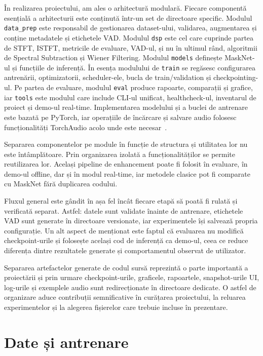 \documentclass[12pt,a4paper]{report}
\begin{document}
În realizarea proiectului, am ales o arhitectură modulară. Fiecare 
componentă esențială a arhitecturii este conținută într-un set de 
directoare specific. Modulul \texttt{data\_prep} este responsabil de 
gestionarea dataset-ului, validarea, augmentarea și conține metadatele
și etichetele VAD. Modulul \texttt{dsp} este cel care cuprinde partea de STFT,
ISTFT, metricile de evaluare, VAD-ul, și nu în ultimul rând, 
algoritmii de Spectral Subtraction și Wiener Filtering. Modulul 
\texttt{models} definește MaskNet-ul și funcțiile de inferență. În esența 
modulului de \texttt{train} se regăsesc configurarea antrenării, optimizatorii, 
scheduler-ele, bucla de train/validation și checkpointing-ul. Pe 
partea de evaluare, modulul \texttt{eval} produce rapoarte, comparații și 
grafice, iar \texttt{tools} este modulul care include CLI-ul unificat, 
healthcheck-ul, inventarul de proiect și demo-ul real-time.
Implementarea modelului și a buclei de antrenare este bazată pe PyTorch,
iar operațiile de încărcare și salvare audio folosesc funcționalități
TorchAudio acolo unde este necesar~\cite{pytorch,torchaudio}.

Separarea componentelor pe module în funcție de structura și utilitatea 
lor nu este întâmplătoare. Prin organizarea izolată a funcționalităților 
se permite reutilizarea lor. Același pipeline de enhancement poate fi 
folosit în evaluare, în demo-ul offline, dar și în modul real-time, 
iar metodele clasice pot fi comparate cu MaskNet fără duplicarea codului.

Fluxul general este gândit în așa fel încât fiecare etapă să poată fi 
rulată și verificată separat. Astfel: datele sunt validate înainte de 
antrenare, etichetele VAD sunt generate în directoare versionate, iar 
experimentele își salvează propria configurație. Un alt aspect de 
menționat este faptul că evaluarea nu modifică checkpoint-urile și 
folosește același cod de inferență ca demo-ul, ceea ce reduce diferența 
dintre rezultatele generate și comportamentul observat de utilizator.

Separarea artefactelor generate de codul sursă reprezintă o parte 
importantă a proiectării și prin urmare checkpoint-urile, graficele, 
rapoartele, snapshot-urile UI, log-urile și exemplele audio sunt 
redirecționate în directoare dedicate. O astfel de organizare aduce 
contribuții semnificative în curățarea proiectului, la reluarea experimentelor 
și la alegerea fișierelor care trebuie incluse în prezentare.

\section{Date și antrenare}
\end{document}
